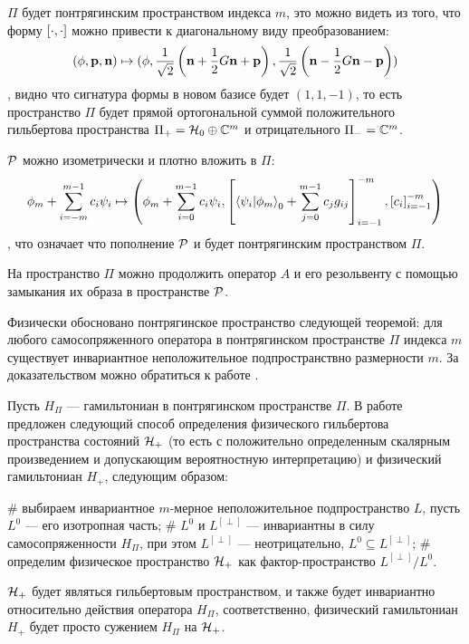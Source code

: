 $\Pi$ будет понтрягинским пространством индекса $m$, это можно видеть из того, что форму $[\cdot,\cdot]$ можно привести к диагональному виду преобразованием:
\[
(\phi, \vb{p}, \vb{n})
\mapsto
(\phi,
\frac{1}{\sqrt{2}} \left( \vb{n} + \frac{1}{2} G \vb{n} + \vb{p} \right),
\frac{1}{\sqrt{2}} \left( \vb{n} - \frac{1}{2} G \vb{n} - \vb{p} \right))
\]
, видно что сигнатура формы в новом базисе будет $(1, 1, -1)$, то есть пространство $\Pi$ будет прямой ортогональной суммой положительного гильбертова пространства $\Pi_+ = \mathcal{H}_{0} \oplus \mathbb{C}^m$ и отрицательного $\Pi_- = \mathbb{C}^m$.


$\mathcal{P}$ можно изометрически и плотно вложить в $\Pi$:
\[
\phi_m + \sum\limits_{i = -m}^{m - 1} c_i \psi_i \mapsto
\left(
\phi_m + \sum\limits_{i = 0}^{m - 1} c_i \psi_i,
\left[ \ip{\psi_i}{\phi_m}_0 + \sum\limits_{j = 0}^{m - 1} c_j g_{ij} \right]_{i = -1}^{-m},
\left[ c_i \right]_{i = -1}^{-m}
\right)
\]
, что означает что пополнение $\mathcal{P}$ и будет понтрягинским пространством $\Pi$.

На пространство $\Pi$ можно продолжить оператор $A$ и его резольвенту с помощью замыкания их образа в пространстве $\mathcal{P}$.

Физически обосновано понтрягинское пространство следующей теоремой: для любого самосопряженного оператора в понтрягинском пространстве $\Pi$ индекса $m$ существует инвариантное неположительное подпространствно размерности $m$. За доказательством можно обратиться к работе \cite{pontryagin1944hermetian}.

Пусть $H_\Pi$ — гамильтониан в понтрягинском пространстве $\Pi$. В работе \cite{shondin1995perturbations} предложен следующий способ определения физического гильбертова пространства состояний $\mathcal{H}_{+}$ (то есть с положительно определенным скалярным произведением и допускающим вероятностную интерпретацию) и физический гамильтониан $H_+$, следующим образом: 
\begin{elist}
# выбираем инвариантное $m$-мерное неположительное подпространство $L$, пусть $L^0$ — его изотропная часть;
# $L^0$ и $L^{[\perp]}$ — инвариантны в силу самосопряженности $H_\Pi$, при этом $L^{[\perp]}$ — неотрицательно, $L^0 \subseteq L^{[\perp]}$;
# определим физическое пространство $\mathcal{H}_{+}$ как фактор-пространство $L^{[\perp]} / L^0$.
\end{elist}
$\mathcal{H}_{+}$ будет являться гильбертовым пространством, и также будет инвариантно относительно действия оператора $H_\Pi$, соответственно, физический гамильтониан $H_+$ будет просто сужением $H_\Pi$ на $\mathcal{H}_{+}$.

